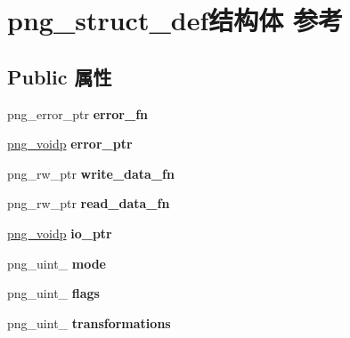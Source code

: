 \hypertarget{structpng__struct__def}{}\section{png\+\_\+struct\+\_\+def结构体 参考}
\label{structpng__struct__def}
\subsection*{Public 属性}
\begin{DoxyCompactItemize}
\item 
\mbox{\label{structpng__struct__def_a2cc5bd1cf507373992a61cf725a730cd}} 
png\+\_\+error\+\_\+ptr {\bfseries error\+\_\+fn}
\item 
\mbox{\label{structpng__struct__def_a06837611b772a6a44cf6306ea08d40a8}} 
\hyperlink{interfacevoid}{png\+\_\+voidp} {\bfseries error\+\_\+ptr}
\item 
\mbox{\label{structpng__struct__def_acc53cd87f0ffc4d1f67da7e10a94af39}} 
png\+\_\+rw\+\_\+ptr {\bfseries write\+\_\+data\+\_\+fn}
\item 
\mbox{\label{structpng__struct__def_a83804076437d1587fab947c056bb56ae}} 
png\+\_\+rw\+\_\+ptr {\bfseries read\+\_\+data\+\_\+fn}
\item 
\mbox{\label{structpng__struct__def_a996f6f8aaa00ede3bb147714ee7c480e}} 
\hyperlink{interfacevoid}{png\+\_\+voidp} {\bfseries io\+\_\+ptr}
\item 
\mbox{\label{structpng__struct__def_a6db33193ca2fdb01fa6d8da9756bd448}} 
png\+\_\+uint\+\_ {\bfseries mode}
\item 
\mbox{\label{structpng__struct__def_aa7529cc3d13e759037c504fddd6e1ae8}} 
png\+\_\+uint\+\_ {\bfseries flags}
\item 
\mbox{\label{structpng__struct__def_a4ab3e33248dd4c32880609a1a10fa725}} 
png\+\_\+uint\+\_ {\bfseries transformations}
\item 
\mbox{\label{structpng__struct__def_a5bfc727f45873680edacf4d12bebc8f4}} 

\end{DoxyCompactItemize}
